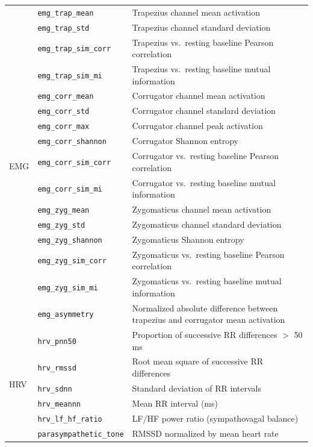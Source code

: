 \documentclass[10pt, twocolumn]{article}
\begin{document}
\begin{table}[t]
\begin{tabular}{llp{7.8cm}}
\midrule
\multirow{16}{*}{EMG}
  & \texttt{emg\_trap\_mean}       & Trapezius channel mean activation \\
  & \texttt{emg\_trap\_std}        & Trapezius channel standard deviation \\
  & \texttt{emg\_trap\_sim\_corr}  & Trapezius vs.\ resting baseline Pearson correlation \\
  & \texttt{emg\_trap\_sim\_mi}    & Trapezius vs.\ resting baseline mutual information \\
  & \texttt{emg\_corr\_mean}       & Corrugator channel mean activation \\
  & \texttt{emg\_corr\_std}        & Corrugator channel standard deviation \\
  & \texttt{emg\_corr\_max}        & Corrugator channel peak activation \\
  & \texttt{emg\_corr\_shannon}    & Corrugator Shannon entropy \\
  & \texttt{emg\_corr\_sim\_corr}  & Corrugator vs.\ resting baseline Pearson correlation \\
  & \texttt{emg\_corr\_sim\_mi}    & Corrugator vs.\ resting baseline mutual information \\
  & \texttt{emg\_zyg\_mean}        & Zygomaticus channel mean activation \\
  & \texttt{emg\_zyg\_std}         & Zygomaticus channel standard deviation \\
  & \texttt{emg\_zyg\_shannon}     & Zygomaticus Shannon entropy \\
  & \texttt{emg\_zyg\_sim\_corr}   & Zygomaticus vs.\ resting baseline Pearson correlation \\
  & \texttt{emg\_zyg\_sim\_mi}     & Zygomaticus vs.\ resting baseline mutual information \\
  & \texttt{emg\_asymmetry}        & Normalized absolute difference between trapezius and corrugator mean activation \\
\midrule
\multirow{6}{*}{HRV}
  & \texttt{hrv\_pnn50}            & Proportion of successive RR differences $>$ 50\,ms \\
  & \texttt{hrv\_rmssd}            & Root mean square of successive RR differences \\
  & \texttt{hrv\_sdnn}             & Standard deviation of RR intervals \\
  & \texttt{hrv\_meannn}           & Mean RR interval (ms) \\
  & \texttt{hrv\_lf\_hf\_ratio}    & LF/HF power ratio (sympathovagal balance) \\
  & \texttt{parasympathetic\_tone} & RMSSD normalized by mean heart rate \\
\bottomrule
\end{tabular}
\end{table}
\end{document}
